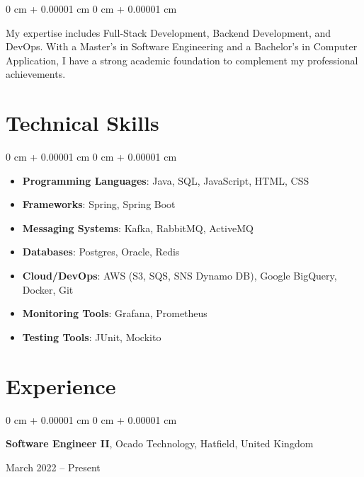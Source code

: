 \documentclass[10pt, letterpaper]{article}
\newenvironment{highlights}{
    \begin{itemize}[
        topsep=0.10 cm,
        parsep=0.10 cm,
        partopsep=0pt,
        itemsep=0pt,
        leftmargin=0 cm + 10pt
    ]
}{
    \end{itemize}
} %
\newenvironment{onecolentry}{
    \begin{adjustwidth}{
        0 cm + 0.00001 cm
    }{
        0 cm + 0.00001 cm
    }
}{
    \end{adjustwidth}
} %
\newenvironment{twocolentry}[2][]{
    \onecolentry
    \def\secondColumn{#2}
    \setcolumnwidth{\fill, 4.5 cm}
    \begin{paracol}{2}
}{
    \switchcolumn \raggedleft \secondColumn
    \end{paracol}
    \endonecolentry
} %
\begin{document}
        \vspace{0.2 cm}
        
        \begin{onecolentry}
            My expertise includes Full-Stack Development, Backend Development, and DevOps. With a Master’s in Software Engineering and a Bachelor’s in Computer Application, I have a strong academic foundation to complement my professional achievements.
        \end{onecolentry}

        \vspace{0.2 cm}
    
    \section{Technical Skills}

    \begin{onecolentry}
        \begin{highlights}
            \item \textbf{Programming Languages}: Java, SQL, JavaScript, HTML, CSS
            \item \textbf{Frameworks}: Spring, Spring Boot
            \item \textbf{Messaging Systems}: Kafka, RabbitMQ, ActiveMQ
            \item \textbf{Databases}: Postgres, Oracle, Redis
            \item \textbf{Cloud/DevOps}: AWS (S3, SQS, SNS Dynamo DB), Google BigQuery, Docker, Git 
            \item \textbf{Monitoring Tools}: Grafana, Prometheus
            \item \textbf{Testing Tools}: JUnit, Mockito
        \end{highlights}
    \end{onecolentry}

    \section{Experience}
        
        \begin{twocolentry}{
            March 2022 – Present
        }
            \textbf{Software Engineer II}, Ocado Technology, Hatfield, United Kingdom
        \end{twocolentry}
\end{document}
